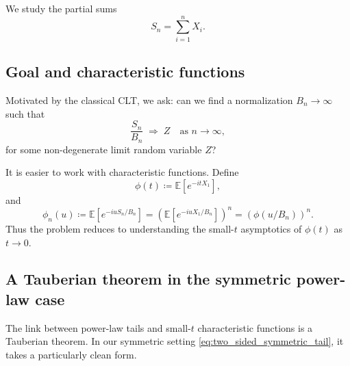 \documentclass[11pt]{article}
\begin{document}
We study the partial sums
\begin{equation}\label{eq:Sn_def}
S_n = \sum_{i=1}^n X_i.
\end{equation}

\subsection{Goal and characteristic functions}\label{subsec:goal_cf}

Motivated by the classical CLT, we ask: can we find a normalization $B_n\to\infty$ such that
\begin{equation}\label{eq:goal_Sn}
\frac{S_n}{B_n}\;\Rightarrow\; Z
\quad \text{as } n\to\infty,
\end{equation}
for some non-degenerate limit random variable $Z$?

It is easier to work with characteristic functions. Define
\begin{equation}\label{eq:phi_def}
\phi(t)\coloneqq {\mathbb E}\!\left[e^{-itX_1}\right],
\end{equation}
and
\begin{equation}\label{eq:phi_n_def}
\phi_n(u) \coloneqq {\mathbb E}\!\left[e^{-iuS_n/B_n}\right]
= \left({\mathbb E}\!\left[e^{-iuX_1/B_n}\right]\right)^n
= \left(\phi(u/B_n)\right)^n.
\end{equation}
Thus the problem reduces to understanding the small-$t$ asymptotics of $\phi(t)$ as $t\to 0$.

\subsection{A Tauberian theorem in the symmetric power-law case}\label{subsec:tauberian_symmetric}

The link between power-law tails and small-$t$ characteristic functions is a Tauberian theorem. In our symmetric setting \eqref{eq:two_sided_symmetric_tail}, it takes a particularly clean form.
\end{document}
